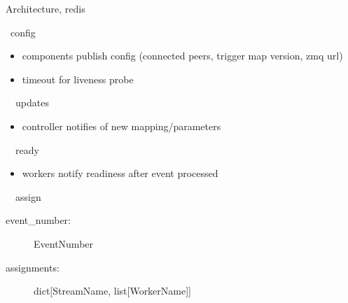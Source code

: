 \documentclass[aspectratio=169]{beamer}
\begin{document}
\begin{frame}{Architecture, redis}
 \begin{block}{\faDatabase\ config}
  \begin{itemize}
   \item components publish config (connected peers, trigger map version, zmq url)
   \item timeout for liveness probe
  \end{itemize}
 \end{block}

 \begin{block}{\faDatabase\ \faForward\ updates}
  \begin{itemize}
   \item controller notifies of new mapping/parameters
  \end{itemize}
 \end{block}

 \begin{block}{\faDatabase\ \faForward\ ready}
  \begin{itemize}
   \item workers notify readiness after event processed
  \end{itemize}
 \end{block}

 \begin{block}{\faDatabase\ \faForward\ assign}
  \begin{description}
   \item[event\_number:] EventNumber
   \item[assignments:] dict[StreamName, list[WorkerName]]
  \end{description}

 \end{block}

\end{frame}
\end{document}

